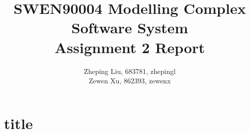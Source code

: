 \documentclass[11pt]{article}
\title{SWEN90004 Modelling Complex Software System\\
        \textbf{Assignment 2 Report}}
\author{Zheping Liu, 683781, zhepingl\\
        Zewen Xu, 862393, zewenx}
\date{}
\begin{document}
    \maketitle
    \section{title}
\end{document}
